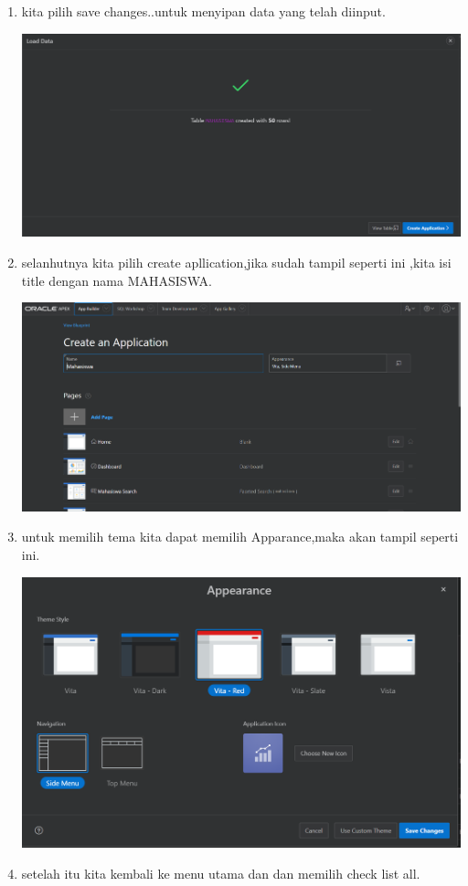 \documentclass{article}
\begin{document}
\begin{enumerate}
\begin{center}
\end{center}
    \item kita pilih save changes..untuk menyipan data yang telah diinput.
    \begin{center}
    \includegraphics[width=.8\textwidth]{8.PNG}
\end{center}
    \item selanhutnya kita pilih create apllication,jika sudah tampil seperti ini ,kita isi title dengan nama MAHASISWA.
    \begin{center}
    \includegraphics[width=.8\textwidth]{9.PNG}
\end{center}
    \item untuk memilih tema kita dapat memilih Apparance,maka akan tampil seperti ini.
    \begin{center}
    \includegraphics[width=.8\textwidth]{10.PNG}
\end{center}
    \item setelah itu kita kembali ke menu utama dan dan memilih check list all.

\end{enumerate}
\end{document}
